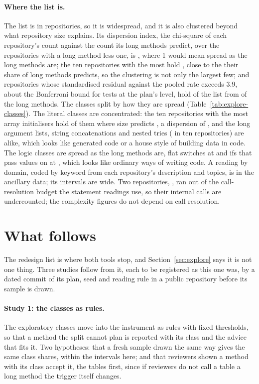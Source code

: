\documentclass[11pt,a4paper]{article}
\begin{document}
\paragraph{Where the list is.} The list is in \exRepos{} repositories, so
it is widespread, and it is also clustered beyond what repository size
explains. Its dispersion index, the chi-square of each repository's count
against the count its long methods predict, over the repositories with a
long method less one, is \exDispersion{}, where 1 would mean spread as the
long methods are; the ten repositories with the most hold
\exTopTenShare{}, close to the \exTopTenSizeShare{} their share of long
methods predicts, so the clustering is not only the largest few; and
\exHotRepos{} repositories whose standardised residual against the pooled
rate exceeds 3.9, about the Bonferroni bound for \nUsable{} tests at the
plan's level, hold \exHotShare{} of the list from \exHotLongShare{} of the
long methods. The classes split by how they are spread
(Table~\ref{tab:explore-classes}). The literal classes are concentrated:
the ten repositories with the most array initialisers hold
\exArrayTopTen{} of them where size predicts \exArrayTopTenSize{}, a
dispersion of \exArrayDispersion{}, and the long argument lists, string
concatenations and nested tries (\exNestedTryTopTen{} in ten repositories)
are alike, which looks like generated code or a house style of building
data in code. The logic classes are spread as the long methods are, flat
switches at \exFlatDispersion{} and ifs that pass values on at
\exIfPassDispersion{}, which looks like ordinary ways of writing code. A
reading by domain, coded by keyword from each repository's description and
topics, is in the ancillary data; its intervals are wide. Two repositories,
\exBudgetRepos{}, ran out of the call-resolution budget the statement
readings use, so their internal calls are undercounted; the complexity
figures do not depend on call resolution.

\section{What follows}\label{sec:next}

The redesign list is where both tools stop, and Section~\ref{sec:explore}
says it is not one thing. Three studies follow from it, each to be
registered as this one was, by a dated commit of its plan, seed and reading
rule in a public repository before its sample is drawn.

\paragraph{Study 1: the classes as rules.} The exploratory classes move
into the instrument as rules with fixed thresholds, so that a method the
split cannot plan is reported with its class and the advice that fits it.
Two hypotheses: that a fresh sample drawn the same way gives the same class
shares, within the intervals here; and that reviewers shown a method with
its class accept it, the tables first, since if reviewers do not call a
table a long method the trigger itself changes.
\end{document}
